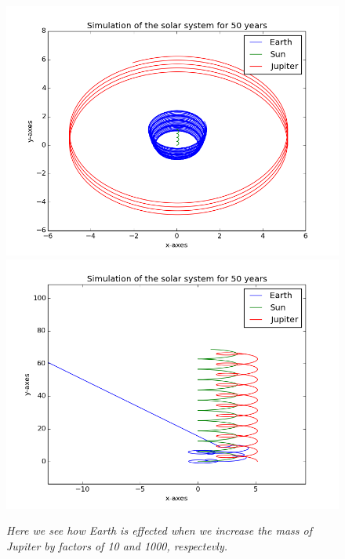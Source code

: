 \documentclass[a4paper,12pt, english]{article}
\begin{document}
\begin{figure}[h!]
  \centering
   	 \includegraphics[scale=0.4]{Jupiter_10.png}\includegraphics[scale=0.4]{Jupiter_1000.png}
  \caption{\textit{Here we see how Earth is effected when we increase the mass of Jupiter by factors of 10 and 1000, respectevly.}}
\end{figure}
\end{document}
